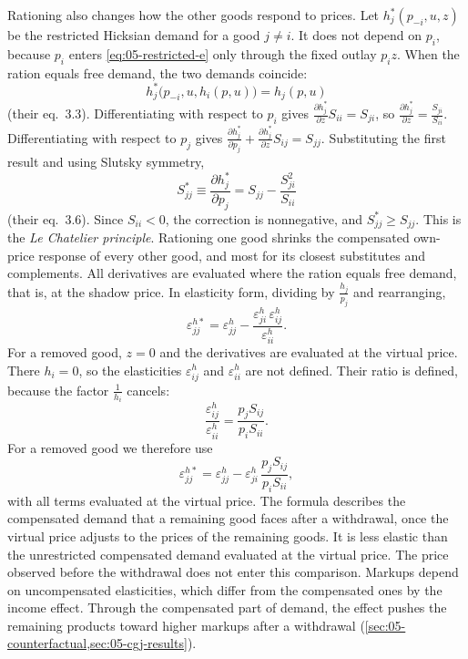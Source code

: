 Rationing also changes how the other goods respond to prices. Let $h^*_j(p_{-i}, u, z)$ be the
restricted Hicksian demand for a good $j \neq i$. It does not depend on $p_i$, because $p_i$ enters
\eqref{eq:05-restricted-e} only through the fixed outlay $p_iz$. When the ration equals free demand, the
two demands coincide:
\begin{equation*}
  h^*_j\bigl(p_{-i}, u, h_i(p, u)\bigr) = h_j(p, u)
\end{equation*}
(their eq.~3.3). Differentiating with respect to $p_i$ gives $\frac{\partial h^*_j}{\partial z}S_{ii} =
S_{ji}$, so $\frac{\partial h^*_j}{\partial z} = \frac{S_{ji}}{S_{ii}}$. Differentiating with respect to
$p_j$ gives $\frac{\partial h^*_j}{\partial p_j} + \frac{\partial h^*_j}{\partial z}S_{ij} = S_{jj}$.
Substituting the first result and using Slutsky symmetry,
\begin{equation}\label{eq:05-le-chatelier}
  S^*_{jj} \equiv \frac{\partial h^*_j}{\partial p_j} = S_{jj} - \frac{S_{ji}^2}{S_{ii}}
\end{equation}
(their eq.~3.6). Since $S_{ii} < 0$, the correction is nonnegative, and $S^*_{jj} \ge S_{jj}$. This is the
\emph{Le Chatelier principle}. Rationing one good shrinks the compensated own-price response of every
other good, and most for its closest substitutes and complements. All derivatives are evaluated where
the ration equals free demand, that is, at the shadow price. In elasticity form, dividing by
$\frac{h_j}{p_j}$ and rearranging,
\begin{equation}\label{eq:05-le-chatelier-elast}
  \varepsilon^{h*}_{jj} = \varepsilon^h_{jj} - \frac{\varepsilon^h_{ji}\,\varepsilon^h_{ij}}{\varepsilon^h_{ii}} .
\end{equation}
For a removed good, $z = 0$ and the derivatives are evaluated at the virtual price. There $h_i = 0$, so
the elasticities $\varepsilon^h_{ij}$ and $\varepsilon^h_{ii}$ are not defined. Their ratio is defined,
because the factor $\frac{1}{h_i}$ cancels:
\begin{equation*}
  \frac{\varepsilon^h_{ij}}{\varepsilon^h_{ii}} = \frac{p_jS_{ij}}{p_iS_{ii}} .
\end{equation*}
For a removed good we therefore use
\begin{equation}\label{eq:05-le-chatelier-removed}
  \varepsilon^{h*}_{jj} = \varepsilon^h_{jj} - \varepsilon^h_{ji}\,\frac{p_jS_{ij}}{p_iS_{ii}} ,
\end{equation}
with all terms evaluated at the virtual price. The formula describes the compensated demand that a
remaining good faces after a withdrawal, once the virtual price adjusts to the prices of the remaining
goods. It is less elastic than the unrestricted compensated demand evaluated at the virtual price. The
price observed before the withdrawal does not enter this comparison. Markups depend on uncompensated elasticities, which differ from the compensated ones by the income
effect. Through the compensated part of demand, the effect pushes the remaining products toward higher
markups after a withdrawal (\cref{sec:05-counterfactual,sec:05-cgj-results}).

